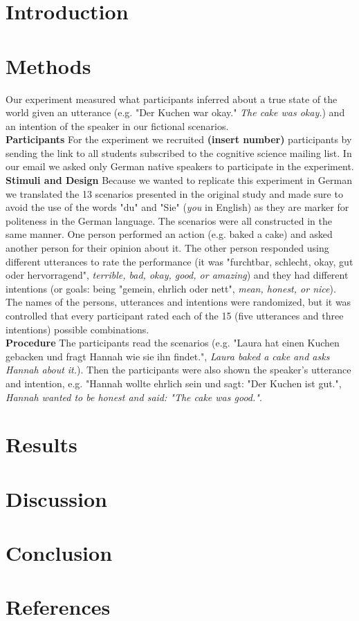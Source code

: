 \documentclass[a4paper,11pt]{article}
\title{}
\author{}
\begin{document}
\maketitle

\section{Introduction}


\section{Methods}
Our experiment measured what participants inferred about a true state of the world given an utterance (e.g. "Der Kuchen war okay." \textit{The cake was okay.}) and an intention of the speaker in our fictional scenarios. \\
\textbf{Participants} For the experiment we recruited \textbf{(insert number)} participants by sending the link to all students subscribed to the cognitive science mailing list. In our email we asked only German native speakers to participate in the experiment.\\
\textbf{Stimuli and Design} Because we wanted to replicate this experiment in German we translated the 13 scenarios presented in the original study and made sure to avoid the use of the words "du" and "Sie" (\textit{you} in English) as they are marker for politeness in the German language. The scenarios were all constructed in the same manner. One person performed an action (e.g. baked a cake) and asked another person for their opinion about it. The other person responded using different utterances to rate the performance (it was "furchtbar, schlecht, okay, gut oder hervorragend", \textit{terrible, bad, okay, good, or amazing}) and they had different intentions (or goals: being "gemein, ehrlich oder nett", \textit{mean, honest, or nice}). The names of the persons, utterances and intentions were randomized, but it was controlled that every participant rated each of the 15 (five utterances and three intentions) possible combinations.\\
\textbf{Procedure} The participants read the scenarios (e.g. "Laura hat einen Kuchen gebacken und fragt Hannah wie sie ihn findet.", \textit{Laura baked a cake and asks Hannah about it.}). Then the participants were also shown the speaker's utterance and intention, e.g. "Hannah wollte ehrlich sein und sagt: "Der Kuchen ist gut.", \textit{Hannah wanted to be honest and said: "The cake was good."}.

\section{Results}

\section{Discussion}

\section{Conclusion}

\section{References}
\end{document}
